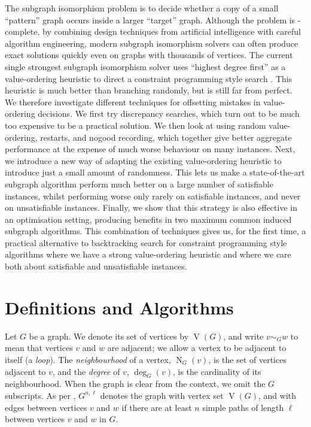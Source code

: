 \documentclass[letterpaper]{article} %
\newcommand{\neighbourhood}{\operatorname{N}}
\newcommand{\vertexset}{\operatorname{V}}
\newcommand{\citet}[1]{\citeauthor{#1} \shortcite{#1}}
\begin{document}
The subgraph isomorphism problem is to decide whether a copy of a small ``pattern'' graph occurs
inside a larger ``target'' graph. Although the problem is \NP-complete, by combining design techniques from
artificial intelligence with careful algorithm engineering, modern subgraph isomorphism solvers can
often produce exact solutions quickly even on graphs with thousands of vertices. The current single
strongest subgraph isomorphism solver uses ``highest degree first'' as a value-ordering heuristic to
direct a constraint programming style search
\cite{DBLP:conf/cp/McCreeshP15,DBLP:conf/lion/KotthoffMS16,DBLP:journals/jair/McCreeshPST18}. This
heuristic is much better than branching randomly, but is still far from perfect. We therefore
investigate different techniques for offsetting mistakes in value-ordering decisions. We first try
discrepancy searches, which turn out to be much too expensive to be a practical solution. We then
look at using random value-ordering, restarts, and nogood recording, which together give better
aggregate performance at the expense of much worse behaviour on many instances. Next, we introduce a
new way of adapting the existing value-ordering heuristic to introduce just a small amount of
randomness.  This lets us make a state-of-the-art subgraph algorithm perform much better
on a large number of satisfiable instances, whilst performing worse only rarely on satisfiable
instances, and never on unsatisfiable instances. Finally, we show that this strategy is also
effective in an optimisation setting, producing benefits in two maximum common induced subgraph
algorithms. This combination of techniques gives us, for the first time, a practical alternative to
backtracking search for constraint programming style algorithms where we have a strong
value-ordering heuristic and where we care both about satisfiable and unsatisfiable instances.

\section{Definitions and Algorithms}

Let $G$ be a graph. We denote its set of vertices by $\vertexset(G)$, and write $v \sim_G w$ to mean
that vertices $v$ and $w$ are adjacent; we allow a vertex to be adjacent to itself (a \emph{loop}). The
\emph{neighbourhood} of a vertex, $\neighbourhood_G(v)$, is the set of vertices adjacent to $v$, and
the \emph{degree} of $v$, $\deg_G(v)$, is the cardinality of its neighbourhood. When the graph is clear from the context, we omit
the $G$ subscripts. As per \citet{DBLP:conf/aaai/HoffmannMR17}, $G^{n,\ell}$ denotes the graph with
vertex set $\vertexset(G)$, and with edges between vertices $v$ and $w$ if there are at least $n$
simple paths of length $\ell$ between vertices $v$ and $w$ in $G$.
\end{document}
